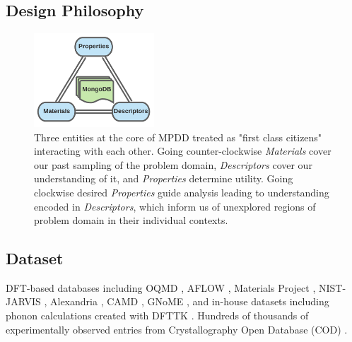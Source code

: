 \subsection{Design Philosophy} \label{mpdd:ssec:designphilosophy}

\begin{figure}[H]
    \centering
    \includegraphics[width=0.4\textwidth]{mpdd/MPDD_CoreTriplet.png}
    \caption{Three entities at the core of MPDD treated as "first class citizens" interacting with each other. Going counter-clockwise \emph{Materials} cover our past sampling of the problem domain, \emph{Descriptors} cover our understanding of it, and \emph{Properties} determine utility. Going clockwise desired \emph{Properties} guide analysis leading to understanding encoded in \emph{Descriptors}, which inform us of unexplored regions of problem domain in their individual contexts.}
    \label{mpdd:fig:core}
\end{figure}



\subsection{Dataset} \label{mpdd:ssec:dataset}

DFT-based databases including OQMD \cite{Saal2013MaterialsOQMD, Kirklin2015TheEnergies, Shen2022ReflectionsOQMD}, AFLOW \cite{Curtarolo2013AFLOW:Discovery, Toher2018TheDiscovery}, Materials Project \cite{Jain2013Commentary:Innovation}, NIST-JARVIS \cite{Choudhary2020TheDesign}, Alexandria \cite{Schmidt2022AFunctionals}, CAMD \cite{Ye2022NovelAgents}, GNoME \cite{Merchant2023ScalingDiscovery}, and in-house datasets including phonon calculations created with DFTTK \cite{Wang2021DFTTK:Calculations}. Hundreds of thousands of experimentally observed entries from Crystallography Open Database (COD) \cite{Grazulis2009CrystallographyStructures, Grazulis2012CrystallographyCollaboration, Grazulis2019CrystallographyPerspectives}.



